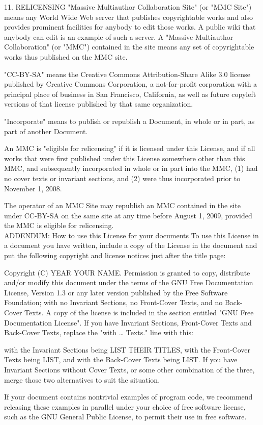 \documentclass[10pt,a4paper]{article}
\begin{document}
\begin{scriptsize}
11. RELICENSING
"Massive Multiauthor Collaboration Site" (or "MMC Site") means any World Wide Web server that publishes copyrightable works and also provides prominent facilities for anybody to edit those works. A public wiki that anybody can edit is an example of such a server. A "Massive Multiauthor Collaboration" (or "MMC") contained in the site means any set of copyrightable works thus published on the MMC site.

"CC-BY-SA" means the Creative Commons Attribution-Share Alike 3.0 license published by Creative Commons Corporation, a not-for-profit corporation with a principal place of business in San Francisco, California, as well as future copyleft versions of that license published by that same organization.

"Incorporate" means to publish or republish a Document, in whole or in part, as part of another Document.

An MMC is "eligible for relicensing" if it is licensed under this License, and if all works that were first published under this License somewhere other than this MMC, and subsequently incorporated in whole or in part into the MMC, (1) had no cover texts or invariant sections, and (2) were thus incorporated prior to November 1, 2008.

The operator of an MMC Site may republish an MMC contained in the site under CC-BY-SA on the same site at any time before August 1, 2009, provided the MMC is eligible for relicensing.\\

ADDENDUM: How to use this License for your documents
To use this License in a document you have written, include a copy of the License in the document and put the following copyright and license notices just after the title page:

    Copyright (C)  YEAR  YOUR NAME.
    Permission is granted to copy, distribute and/or modify this document
    under the terms of the GNU Free Documentation License, Version 1.3
    or any later version published by the Free Software Foundation;
    with no Invariant Sections, no Front-Cover Texts, and no Back-Cover Texts.
    A copy of the license is included in the section entitled "GNU
    Free Documentation License".
If you have Invariant Sections, Front-Cover Texts and Back-Cover Texts, replace the "with … Texts." line with this:

    with the Invariant Sections being LIST THEIR TITLES, with the
    Front-Cover Texts being LIST, and with the Back-Cover Texts being LIST.
If you have Invariant Sections without Cover Texts, or some other combination of the three, merge those two alternatives to suit the situation.

If your document contains nontrivial examples of program code, we recommend releasing these examples in parallel under your choice of free software license, such as the GNU General Public License, to permit their use in free software.
\end{scriptsize}
\end{document}
